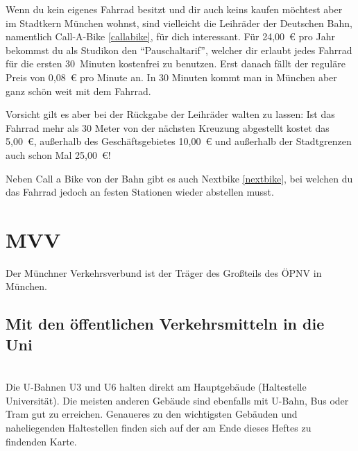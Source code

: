 Wenn du kein eigenes Fahrrad besitzt und dir auch keins kaufen möchtest aber im
Stadtkern München wohnst, sind vielleicht die Leihräder der Deutschen Bahn,
namentlich Call-A-Bike \ref{callabike}, für dich interessant. Für 24,00~€ pro
Jahr bekommst du als Studikon den ``Pauschaltarif'', welcher dir erlaubt jedes
Fahrrad für die ersten 30~Minuten kostenfrei zu benutzen. Erst danach fällt der
reguläre Preis von 0,08~€ pro Minute an. In 30 Minuten kommt man in München
aber ganz schön weit mit dem Fahrrad.

Vorsicht gilt es aber bei der Rückgabe der Leihräder walten zu lassen: Ist das
Fahrrad mehr als 30 Meter von der nächsten Kreuzung abgestellt kostet das
5,00~€, außerhalb des Geschäftsgebietes 10,00~€ und außerhalb der Stadtgrenzen
auch schon Mal 25,00~€!

Neben Call a Bike von der Bahn gibt es auch Nextbike \ref{nextbike}, bei
welchen du das Fahrrad jedoch an festen Stationen wieder abstellen musst.

\begin{urlList}
\end{urlList}



\section{MVV}
Der Münchner Verkehrsverbund ist der Träger des Großteils des ÖPNV in München.

\subsection*{Mit den öffentlichen Verkehrsmitteln in die Uni}\hfill\\
Die U-Bahnen U3 und U6 halten direkt am Hauptgebäude (Haltestelle Universität).
Die meisten anderen Gebäude sind ebenfalls mit U-Bahn, Bus oder Tram gut zu
erreichen. Genaueres zu den wichtigsten Gebäuden und naheliegenden Haltestellen
finden sich auf der am Ende dieses Heftes zu findenden Karte.


